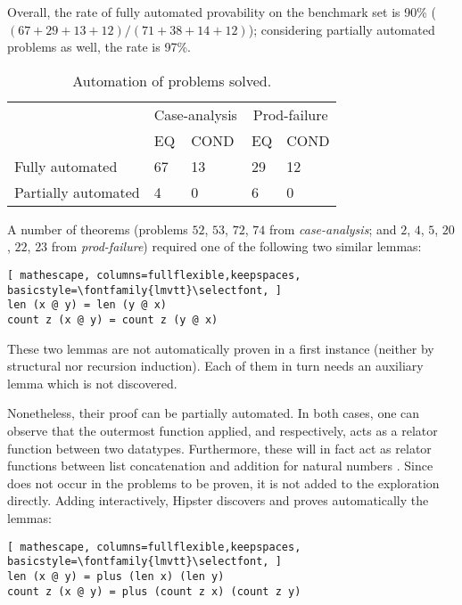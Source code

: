 Overall, the rate of fully automated provability on the benchmark set is 90\% ($(67+29+13+12)/(71+38+14+12)$); considering partially automated problems as well, the rate is 97\%.
%

\begin{table}
\begin{tabularx}{\textwidth}{l | X X | X X}
  & \multicolumn{2}{c|}{Case-analysis} & \multicolumn{2}{c}{Prod-failure} \\
  &  EQ & COND & EQ & COND \\
  \hline
  Fully automated & 67 & 13 & 29 & 12 \\
  Partially automated & 4 & 0 & 6 & 0 \\
\end{tabularx}
\caption{Automation of problems solved.}
\label{tab:auto}
\end{table}

A number of theorems (problems $52$, $53$, $72$, $74$ from \emph{case-analysis}; and $2$, $4$, $5$, $20$, $22$, $23$ from \emph{prod-failure}) required one of the following two similar lemmas:

\begin{lstlisting}[ mathescape, columns=fullflexible,keepspaces, basicstyle=\fontfamily{lmvtt}\selectfont, ]
len (x @ y) = len (y @ x)
count z (x @ y) = count z (y @ x)
\end{lstlisting}

\noindent These two lemmas are not automatically proven in a first instance (neither by structural nor recursion induction).
%
Each of them in turn needs an auxiliary lemma which is not discovered.

Nonetheless, their proof can be partially automated.
%
In both cases, one can observe that the outermost function applied,  and  respectively, acts as a relator function between two datatypes.
%
Furthermore, these will in fact act as relator functions between list concatenation  and addition for natural numbers .
%
Since  does not occur in the problems to be proven, it is not added to the exploration directly.
%
Adding  interactively, Hipster discovers and proves automatically the lemmas:

\begin{lstlisting}[ mathescape, columns=fullflexible,keepspaces, basicstyle=\fontfamily{lmvtt}\selectfont, ]
len (x @ y) = plus (len x) (len y)
count z (x @ y) = plus (count z x) (count z y)
\end{lstlisting}

